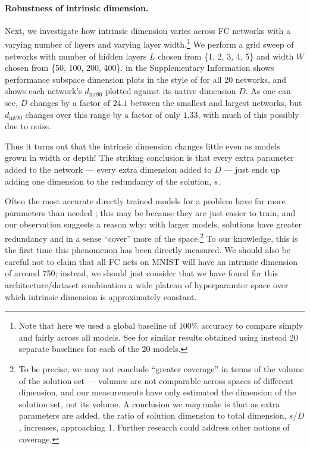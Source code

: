 \documentclass{article} %
\newcommand{\dintn}{d_{\mathrm{int90}}}
\begin{document}
\paragraph{Robustness of intrinsic dimension.}
Next, we investigate how intrinsic dimension varies across FC networks with a varying number of layers and varying layer width.\footnote{Note that here we used a global baseline of 100\% accuracy to compare simply and fairly across all models. See  for similar results obtained using instead 20 separate baselines for each of the 20 models.}
We perform a grid sweep of networks with number of hidden layers $L$ chosen from \{1, 2, 3, 4, 5\} and width $W$ chosen from \{50, 100, 200, 400\}.
 in the Supplementary Information shows performance \vs subspace dimension plots in the style of  for all 20 networks, and
 shows each network's $\dintn$
plotted against its native dimension $D$. As one can see, $D$ changes by a factor of
$24.1$
between the smallest and largest networks, but $\dintn$ changes over this range by a factor of only $1.33$, with much of this possibly due to noise.

Thus it turns out that the intrinsic dimension changes little even as models grown in width or depth!
The striking conclusion is that every extra parameter added to the network --- every extra dimension added to $D$ --- just ends up adding one dimension to the redundancy of the solution, $s$.

Often the most accurate directly trained models for a problem have far more parameters
than needed \citep{zhang2016understanding}; this may be because they are just
easier to train, and our observation suggests a reason why:
with larger models, solutions have greater redundancy and in a sense ``cover'' more of the space.\footnote{To be precise, we may not conclude 
  ``greater coverage'' in terms of the volume of the solution set --- volumes are not comparable across spaces of different dimension, and our measurements have only estimated the dimension of the solution set, not its volume. A conclusion we \emph{may} make is that as extra parameters are added, the ratio of solution dimension to total dimension, $s/D$, increases, approaching 1. Further research could address other notions of coverage.}
%
To our knowledge, this is the first time this phenomenon has been directly measured.
We should also be careful not to claim that all FC nets on MNIST will have an intrinsic dimension of around 750; instead, we should just consider that we have found for this architecture/dataset combination a wide plateau of hyperparamter space over which intrinsic dimension is approximately constant.
\end{document}
